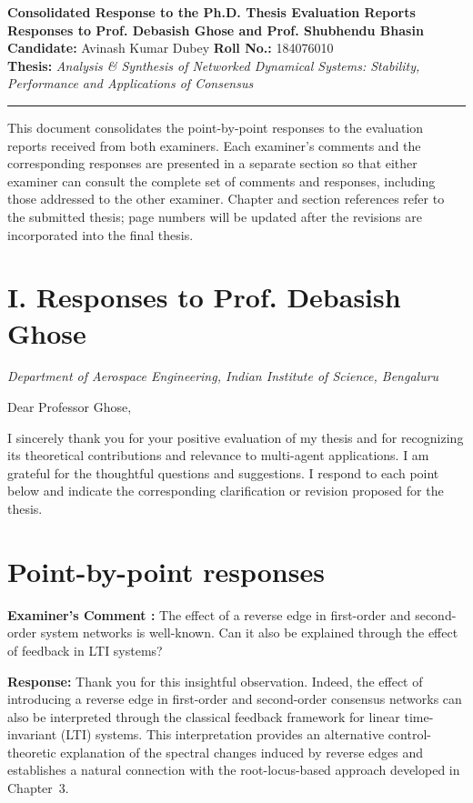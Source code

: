 \documentclass[11pt,a4paper]{article}
\newcounter{examcomment}
\renewcommand{\theexamcomment}{\arabic{examcomment}}
\newcommand{\comment}[1]{%
	\refstepcounter{examcomment}%
	\par\vspace{5pt}\noindent
	\colorbox{gray!13}{%
		\parbox{\dimexpr\linewidth-2\fboxsep}{%
			\textbf{Examiner's Comment \theexamcomment:} #1%
		}%
	}%
	\par
}
\newcommand{\response}{\par\textbf{Response:} }
\begin{document}
\begin{center}
{\Large\bfseries Consolidated Response to the Ph.D. Thesis Evaluation Reports}\\[6pt]
{\large\bfseries Responses to Prof. Debasish Ghose and Prof. Shubhendu Bhasin}\\[10pt]
\textbf{Candidate:} Avinash Kumar Dubey \qquad
\textbf{Roll No.:} 184076010\\
\textbf{Thesis:} \emph{Analysis \& Synthesis of Networked Dynamical Systems:
Stability, Performance and Applications of Consensus}
\end{center}
\vspace{4pt}
\hrule
\vspace{8pt}

This document consolidates the point-by-point responses to the evaluation
reports received from both examiners. Each examiner's comments and the
corresponding responses are presented in a separate section so that either
examiner can consult the complete set of comments and responses, including
those addressed to the other examiner. Chapter and section references refer
to the submitted thesis; page numbers will be updated after the revisions
are incorporated into the final thesis.

\section*{I. Responses to Prof. Debasish Ghose}
\textit{Department of Aerospace Engineering, Indian Institute of Science, Bengaluru}

Dear Professor Ghose,

I sincerely thank you for your positive evaluation of my thesis and for
recognizing its theoretical contributions and relevance to multi-agent
applications. I am grateful for the thoughtful questions and suggestions.
I respond to each point below and indicate the corresponding clarification
or revision proposed for the thesis.

\section*{Point-by-point responses}

\comment{The effect of a reverse edge in first-order and second-order system networks is well-known. Can it also be explained through the effect of feedback in LTI systems?}\label{DG:Feedback}
\response
Thank you for this insightful observation. Indeed, the effect of introducing a reverse edge in first-order and second-order consensus networks can also be interpreted through the classical feedback framework for linear time-invariant (LTI) systems. This interpretation provides an alternative control-theoretic explanation of the spectral changes induced by reverse edges and establishes a natural connection with the root-locus-based approach developed in Chapter~3.
\end{document}
